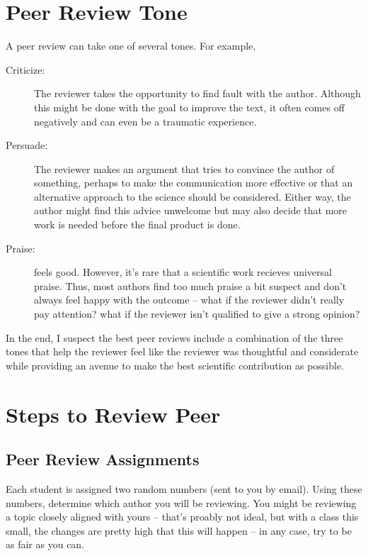 \documentclass{tufte-handout}\usepackage[]{graphicx}\usepackage[]{color}
\begin{document}
\section{Peer Review Tone}

A peer review can take one of several tones. For example, 

\begin{description}
	\item[Criticize:] The reviewer takes the opportunity to find fault with the author. Although this might be done with the goal to improve the text, it often comes off negatively and can even be a traumatic experience. 
	\item[Persuade:] The reviewer makes an argument that tries to convince the author of something, perhaps to make the communication more effective or that an alternative approach to the science should be considered. Either way, the author might find this advice unwelcome but may also decide that more work is needed before the final product is done. 
	\item[Praise:] feels good. However, it's rare that a scientific work recieves universal praise. Thus, most authors find too much praise a bit suspect and don't always feel happy with the outcome -- what if the reviewer didn't really pay attention? what if the reviewer isn't qualified to give a strong opinion?  
\end{description}

In the end, I suspect the best peer reviews include a combination of the three tones that help the reviewer feel like the reviewer was thoughtful and considerate while providing an avenue to make the best scientific contribution as possible. 

\section{Steps to Review Peer}

\subsection{Peer Review Assignments}



Each student is assigned two random numbers (sent to you by email). Using these numbers, determine which author you will be reviewing. You might be reviewing a topic closely aligned with yours -- that's proably not ideal, but with a class this small, the changes are pretty high that this will happen -- in any case, try to be as fair as you can. 
\end{document}
